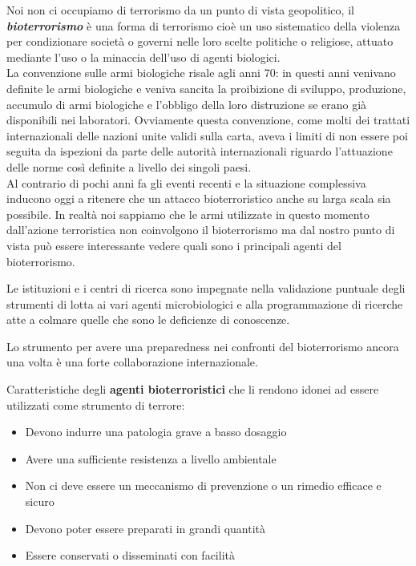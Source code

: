 \documentclass[]{article}
\begin{document}
Noi non ci occupiamo di terrorismo da un punto di vista geopolitico, il
\textbf{\emph{bioterrorismo}} è una forma di terrorismo cioè un uso
sistematico della violenza per condizionare società o governi nelle loro
scelte politiche o religiose, attuato mediante l'uso o la minaccia
dell'uso di agenti biologici.\\
La convenzione sulle armi biologiche risale agli anni 70: in questi anni
venivano definite le armi biologiche e veniva sancita la proibizione di
sviluppo, produzione, accumulo di armi biologiche e l'obbligo della loro
distruzione se erano già disponibili nei laboratori. Ovviamente questa
convenzione, come molti dei trattati internazionali delle nazioni unite
validi sulla carta, aveva i limiti di non essere poi seguita da
ispezioni da parte delle autorità internazionali riguardo l'attuazione
delle norme così definite a livello dei singoli paesi.\\
Al contrario di pochi anni fa gli eventi recenti e la situazione
complessiva inducono oggi a ritenere che un attacco bioterroristico
anche su larga scala sia possibile. In realtà noi sappiamo che le armi
utilizzate in questo momento dall'azione terroristica non coinvolgono il
bioterrorismo ma dal nostro punto di vista può essere interessante
vedere quali sono i principali agenti del bioterrorismo.

Le istituzioni e i centri di ricerca sono impegnate nella validazione
puntuale degli strumenti di lotta ai vari agenti microbiologici e alla
programmazione di ricerche atte a colmare quelle che sono le deficienze
di conoscenze.

Lo strumento per avere una preparedness nei confronti del bioterrorismo
ancora una volta è una forte collaborazione internazionale.

Caratteristiche degli \textbf{agenti bioterroristici} che li rendono
idonei ad essere utilizzati come strumento di terrore:

\begin{itemize}
\item
  Devono indurre una patologia grave a basso dosaggio
\end{itemize}

\begin{itemize}
\item
  Avere una sufficiente resistenza a livello ambientale
\item
  Non ci deve essere un meccanismo di prevenzione o un rimedio efficace
  e sicuro
\item
  Devono poter essere preparati in grandi quantità
\item
  Essere conservati o disseminati con facilità
\end{itemize}
\end{document}
